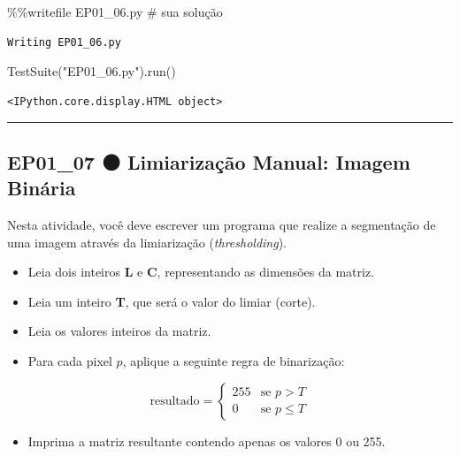 \documentclass[
  portuguese,
  letterpaper,
  openany,
  oneside,
  12pt,
  a4paper]{book}
\newenvironment{Shaded}{\begin{snugshade}}{\end{snugshade}}
\newcommand{\CommentTok}[1]{\textcolor[rgb]{0.37,0.37,0.37}{#1}}
\newcommand{\NormalTok}[1]{\textcolor[rgb]{0.00,0.23,0.31}{#1}}
\newcommand{\OperatorTok}[1]{\textcolor[rgb]{0.37,0.37,0.37}{#1}}
\newcommand{\StringTok}[1]{\textcolor[rgb]{0.13,0.47,0.30}{#1}}
\providecommand{\tightlist}{%
  \setlength{\itemsep}{0pt}\setlength{\parskip}{0pt}}
\begin{document}
\begin{Shaded}
\begin{Highlighting}[]
\OperatorTok{\%\%}\NormalTok{writefile EP01\_06.py}
\CommentTok{\# sua solução}
\end{Highlighting}
\end{Shaded}

\begin{verbatim}
Writing EP01_06.py
\end{verbatim}

\begin{Shaded}
\begin{Highlighting}[]
\NormalTok{TestSuite(}\StringTok{"EP01\_06.py"}\NormalTok{).run()}
\end{Highlighting}
\end{Shaded}

\begin{verbatim}
<IPython.core.display.HTML object>
\end{verbatim}

\begin{center}\rule{0.5\linewidth}{0.5pt}\end{center}

\subsection{EP01\_07 ⚫ Limiarização Manual: Imagem
Binária}\label{ep01_07-limiarizauxe7uxe3o-manual-imagem-binuxe1ria}

Nesta atividade, você deve escrever um programa que realize a
segmentação de uma imagem através da limiarização (\emph{thresholding}).

\begin{itemize}
\tightlist
\item
  Leia dois inteiros \textbf{L} e \textbf{C}, representando as dimensões
  da matriz.
\item
  Leia um inteiro \textbf{T}, que será o valor do limiar (corte).
\item
  Leia os valores inteiros da matriz.
\item
  Para cada pixel \(p\), aplique a seguinte regra de binarização:
\end{itemize}

\[\text{resultado} = \begin{cases} 255 & \text{se } p > T \\ 0 & \text{se } p \le T \end{cases}\]

\begin{itemize}
\tightlist
\item
  Imprima a matriz resultante contendo apenas os valores 0 ou 255.
\end{itemize}
\end{document}
